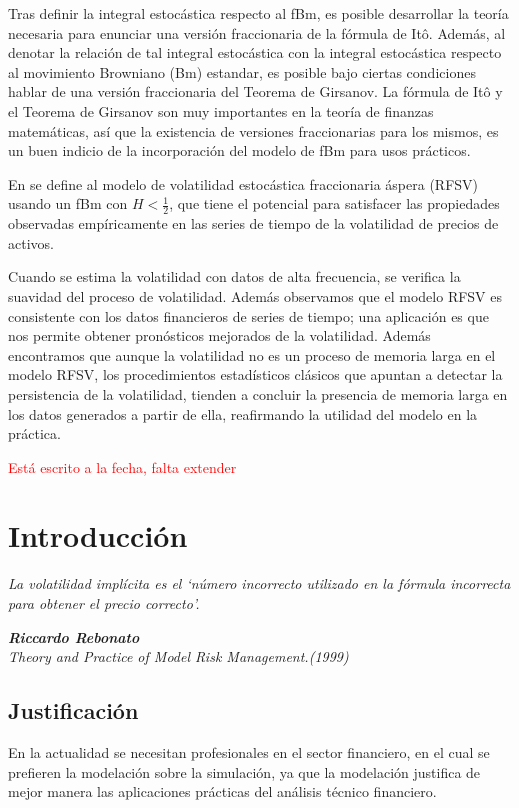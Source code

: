 \documentclass[letterpaper,12pt,oneside]{book}
\theoremstyle{plain}
\numberwithin{theorem}{section}
\begin{document}
Tras definir la integral estocástica respecto al fBm, es posible desarrollar la teoría necesaria para enunciar una versión fraccionaria de la fórmula de Itô. Además, al denotar la relación de tal integral estocástica con la integral estocástica respecto al movimiento Browniano (Bm) estandar, es posible bajo ciertas condiciones hablar de una versión fraccionaria del Teorema de Girsanov. La fórmula de Itô y el Teorema de Girsanov son muy importantes en la teoría de finanzas matemáticas, así que la existencia de versiones fraccionarias para los mismos, es un buen indicio de la incorporación del modelo de fBm para usos prácticos.

En \cite{gatheral_volatility_2018} se define al modelo de volatilidad estocástica fraccionaria áspera (RFSV) usando un fBm con $H <\frac{1}{2}$, que tiene el potencial para satisfacer las propiedades observadas empíricamente en las series de tiempo de la volatilidad de precios de activos.

Cuando se estima la volatilidad con datos de alta frecuencia, se verifica la suavidad del proceso de volatilidad. Además observamos que el modelo RFSV es consistente con los datos financieros de series de tiempo; una aplicación es que nos permite obtener pronósticos mejorados de la volatilidad. Además encontramos que aunque la volatilidad no es un proceso de memoria larga en el modelo RFSV, los procedimientos estadísticos clásicos que apuntan a detectar la persistencia de la volatilidad, tienden a concluir la presencia de memoria larga en los datos generados a partir de ella, reafirmando la utilidad del modelo en la práctica.

\textcolor{red}{Está escrito a la fecha, falta extender}
\newpage
\tableofcontents
\newpage
\listoffigures
\listoftables
\mainmatter
\chapter*{Introducción}
\epigraph{\textsl{La volatilidad implícita es el ‘número incorrecto utilizado en la fórmula incorrecta para obtener el precio correcto'.}}{\textit{\textbf{Riccardo  Rebonato}\\ Theory and Practice of Model Risk Management.(1999)}}
\section*{Justificación}
En la actualidad se necesitan profesionales en el sector financiero, en el cual se prefieren la modelación sobre la simulación, ya que la modelación justifica de mejor manera las aplicaciones prácticas del análisis técnico financiero.
\end{document}
